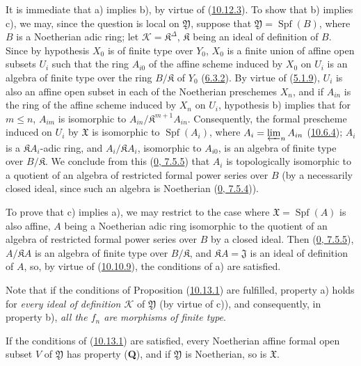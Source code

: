 It is immediate that a) implies b), by virtue of
(\hyperref[I.10.12.3]{10.12.3}). To show that b) implies c), we
may, since the question is local on $\mathfrak{Y}$, suppose that
$\mathfrak{Y}=\operatorname{Spf}(B)$, where $B$ is a Noetherian adic ring; let
$\mathscr{K}=\mathfrak{K}^\Delta$, $\mathfrak{K}$ being an ideal of
definition of $B$. Since by hypothesis $X_0$ is of finite type over $Y_0$,
$X_0$ is a finite union of affine open subsets $U_i$ such that the ring
$A_{i0}$ of the affine scheme induced by $X_0$ on $U_i$ is an algebra of
finite type over the ring $B/\mathfrak{K}$ of $Y_0$
(\hyperref[I.6.3.2]{6.3.2}). By virtue of
(\hyperref[I.5.1.9]{5.1.9}), $U_i$ is also an affine open subset in each
of the Noetherian preschemes $X_n$, and if $A_{in}$ is the ring of the
affine scheme induced by $X_n$ on $U_i$, hypothesis b) implies that for
$m\leq n$, $A_{im}$ is isomorphic to
$A_{in}/\mathfrak{K}^{m+1}A_{in}$. Consequently, the formal prescheme
induced on $U_i$ by $\mathfrak{X}$ is isomorphic to $\operatorname{Spf}(A_i)$,
where $A_i=\varprojlim_n A_{in}$ (\hyperref[I.10.6.4]{10.6.4}); $A_i$ is a
$\mathfrak{K}A_i$-adic ring, and $A_i/\mathfrak{K}A_i$, isomorphic to
$A_{i0}$, is an algebra of finite type over $B/\mathfrak{K}$. We conclude
from this (\hyperref[0.7.5.5]{0, 7.5.5}) that $A_i$ is topologically
isomorphic to a quotient of an algebra of restricted formal power series
over $B$ (by a necessarily closed ideal, since such an algebra is Noetherian
(\hyperref[0.7.5.4]{0, 7.5.4})).

To prove that c) implies a), we may restrict to the case where
$\mathfrak{X}=\operatorname{Spf}(A)$ is also affine, $A$ being a Noetherian
adic ring isomorphic to the quotient of an algebra of restricted formal
power series over $B$ by a closed ideal. Then
(\hyperref[0.7.5.5]{0, 7.5.5}), $A/\mathfrak{K}A$ is an algebra of finite
type over $B/\mathfrak{K}$, and $\mathfrak{K}A=\mathfrak{J}$ is an ideal of
definition of $A$, so, by virtue of
(\hyperref[I.10.10.9]{10.10.9}), the conditions of a) are satisfied.

Note that if the conditions of Proposition
(\hyperref[I.10.13.1]{10.13.1}) are fulfilled, property a) holds
for \emph{every ideal of definition $\mathscr{K}$} of
$\mathfrak{Y}$ (by virtue of c)), and consequently, in property b),
\emph{all the $f_n$ are morphisms of finite type}.

\begin{corollary}[10.13.2]
\label{I.10.13.2}
If the conditions of (\hyperref[I.10.13.1]{10.13.1}) are satisfied,
every Noetherian affine formal open subset $V$ of $\mathfrak{Y}$ has
property (\textbf{Q}), and if $\mathfrak{Y}$ is Noetherian, so is
$\mathfrak{X}$.
\end{corollary}

